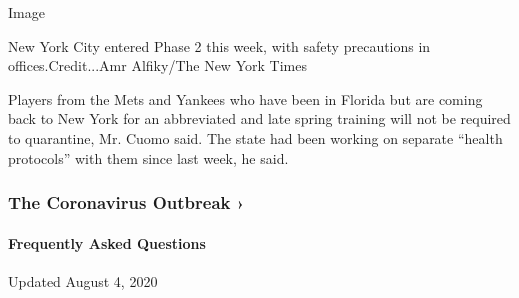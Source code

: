 Image

New York City entered Phase 2 this week, with safety precautions in
offices.Credit...Amr Alfiky/The New York Times

Players from the Mets and Yankees who have been in Florida but are
coming back to New York for an abbreviated and late spring training will
not be required to quarantine, Mr. Cuomo said. The state had been
working on separate ``health protocols'' with them since last week, he
said.

\href{https://www.nytimes3xbfgragh.onion/news-event/coronavirus?action=click\&pgtype=Article\&state=default\&region=MAIN_CONTENT_3\&context=storylines_faq}{}

\hypertarget{the-coronavirus-outbreak-}{%
\subsubsection{The Coronavirus Outbreak
›}\label{the-coronavirus-outbreak-}}

\hypertarget{frequently-asked-questions}{%
\paragraph{Frequently Asked
Questions}\label{frequently-asked-questions}}

Updated August 4, 2020

